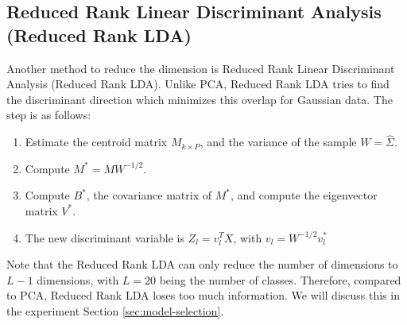 \subsection{Reduced Rank Linear Discriminant Analysis (Reduced Rank LDA)}
\label{sec:data-processing:rr-lda}

Another method to reduce the dimension is Reduced Rank Linear Discriminant Analysis (Reduced Rank LDA).
Unlike PCA, Reduced Rank LDA tries to find the discriminant direction which minimizes this overlap for Gaussian data.
The step is as follows:
\begin{enumerate}
    \item Estimate the centroid matrix $M_{k\times P}$, and the variance of the sample $W=\hat{\Sigma}$.
    \item Compute $M^*=MW^{-1/2}$.
    \item Compute $B^*$, the covariance matrix of $M^*$, and compute the eigenvector matrix $V^*$.
    \item The new discriminant variable is $Z_l=v_l^TX$, with $v_l=W^{-1/2}v_l^*$
\end{enumerate}

Note that the Reduced Rank LDA can only reduce the number of dimensions to $L-1$ dimensions, with $L=20$ being the number of classes.
Therefore, compared to PCA, Reduced Rank LDA loses too much information.
We will discuss this in the experiment Section \ref{sec:model-selection}.